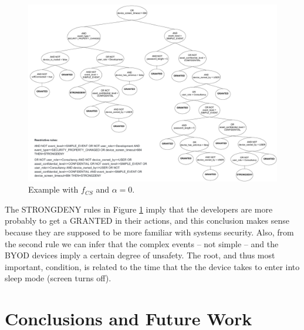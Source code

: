 \documentclass[runningheads]{llncs}
\begin{document}
\begin{figure}[h!tb]
	\centering
	\includegraphics[width=\textwidth]{img/bestInd_fCS_a0.pdf}
	\caption{Example with $f_{CS}$ and $\alpha=0$.} 
	\label{fig:bestInd_fCS_a0}
\end{figure}

The STRONGDENY rules in Figure \ref{fig:bestInd_fCS_a0} imply that
the developers are more probably to get a GRANTED in their actions,
and this conclusion makes sense because they are supposed to
be more familiar with systems security. Also, from the second rule we
can infer that the complex events -- not simple -- and the BYOD
devices imply a certain degree of unsafety. The root, and thus most
important, condition, is related to the time that the the device takes
to enter into sleep mode (screen turns off).



\section{Conclusions and Future Work}
\label{sec:future}
\end{document}
